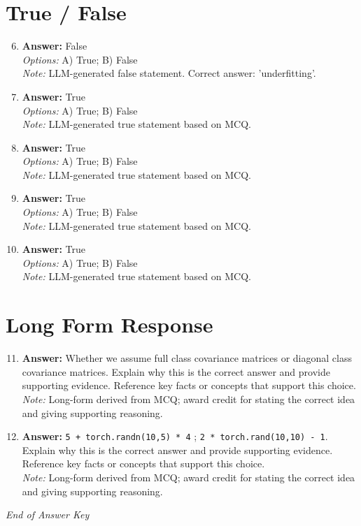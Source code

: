 \documentclass[12pt]{article}
\begin{document}
\section*{True / False}
\begin{enumerate}[label=\arabic*.]
\setcounter{enumi}{5}
\item \textbf{Answer:} False
\\ \textit{Options:} A) True; B) False
\\ \textit{Note:} LLM-generated false statement. Correct answer: 'underfitting'.
\item \textbf{Answer:} True
\\ \textit{Options:} A) True; B) False
\\ \textit{Note:} LLM-generated true statement based on MCQ.
\item \textbf{Answer:} True
\\ \textit{Options:} A) True; B) False
\\ \textit{Note:} LLM-generated true statement based on MCQ.
\item \textbf{Answer:} True
\\ \textit{Options:} A) True; B) False
\\ \textit{Note:} LLM-generated true statement based on MCQ.
\item \textbf{Answer:} True
\\ \textit{Options:} A) True; B) False
\\ \textit{Note:} LLM-generated true statement based on MCQ.
\end{enumerate}

\section*{Long Form Response}
\begin{enumerate}[label=\arabic*.]
\setcounter{enumi}{10}
\item \textbf{Answer:} Whether we assume full class covariance matrices or diagonal class covariance matrices. Explain why this is the correct answer and provide supporting evidence. Reference key facts or concepts that support this choice.
\\ \textit{Note:} Long-form derived from MCQ; award credit for stating the correct idea and giving supporting reasoning.
\item \textbf{Answer:} \texttt{5 + torch.randn(10,5) * 4} ; \texttt{2 * torch.rand(10,10) - 1}. Explain why this is the correct answer and provide supporting evidence. Reference key facts or concepts that support this choice.
\\ \textit{Note:} Long-form derived from MCQ; award credit for stating the correct idea and giving supporting reasoning.
\end{enumerate}

\vfill
\noindent\textit{End of Answer Key}
\end{document}
